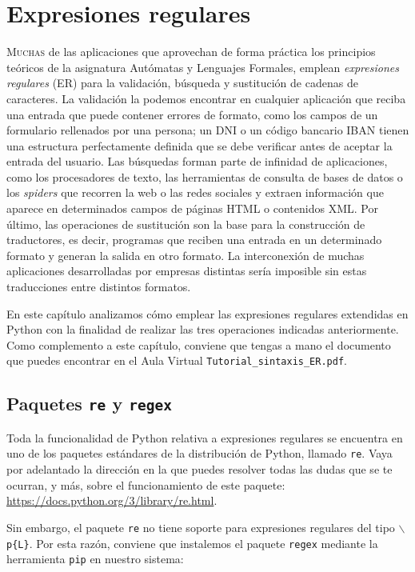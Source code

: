 
\chapter{Expresiones regulares}

\lettrine[lines=5]{M}{uchas} de las aplicaciones que aprovechan de forma práctica los principios teóricos de la asignatura Autómatas y Lenguajes Formales, emplean \emph{expresiones regulares} (ER) para la validación, búsqueda y sustitución de cadenas de caracteres. La validación la podemos encontrar en cualquier aplicación que reciba una entrada que puede contener errores de formato, como los campos de un formulario rellenados por una persona; un DNI o un código bancario IBAN tienen una estructura perfectamente definida que se debe verificar antes de aceptar la entrada del usuario. Las búsquedas forman parte de infinidad de aplicaciones, como los procesadores de texto, las herramientas de consulta de bases de datos o los \emph{spiders} que recorren la web o las redes sociales y extraen información que aparece en determinados campos de páginas HTML o contenidos XML. Por último, las operaciones de sustitución son la base para la construcción de traductores, es decir, programas que reciben una entrada en un determinado formato y generan la salida en otro formato. La interconexión de muchas aplicaciones desarrolladas por empresas distintas sería imposible sin estas traducciones entre distintos formatos.

En este capítulo analizamos cómo emplear las expresiones regulares extendidas en Python con la finalidad de realizar las tres operaciones indicadas anteriormente. Como complemento a este capítulo, conviene que tengas a mano el documento que puedes encontrar en el Aula Virtual \texttt{Tutorial\_sintaxis\_ER.pdf}.

\section{Paquetes \texttt{re} y \texttt{regex}}

Toda la funcionalidad de Python relativa a expresiones regulares se encuentra en uno de los paquetes estándares de la distribución de Python, llamado \texttt{re}. Vaya por adelantado la dirección en la que puedes resolver todas las dudas que se te ocurran, y más, sobre el funcionamiento de este paquete: \url{https://docs.python.org/3/library/re.html}. 

Sin embargo, el paquete \texttt{re} no tiene soporte para expresiones regulares del tipo \texttt{$\backslash$p\{L\}}. Por esta razón, conviene que instalemos el paquete \texttt{regex} mediante la herramienta \texttt{pip} en nuestro sistema:

